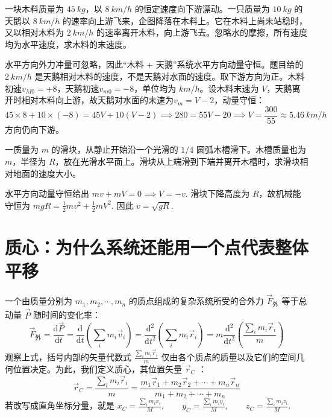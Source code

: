 \documentclass[lang=cn,11pt]{elegantbook}
\begin{document}
\begin{exercise}
一块木料质量为 \(\SI{45}{kg}\)，以 \(\SI{8}{km/h}\) 的恒定速度向下游漂动。一只质量为 \(\SI{10}{kg}\) 的天鹅以 \(\SI{8}{km/h}\) 的速率向上游飞来，企图降落在木料上。它在木料上尚未站稳时，又以相对木料为 \(\SI{2}{km/h}\) 的速率离开木料，向上游飞去。忽略水的摩擦，所有速度均为水平速度，求木料的末速度。
\end{exercise}
\begin{solution}
水平方向外力冲量可忽略，因此“木料 + 天鹅”系统水平方向动量守恒。题目给的 \(\SI{2}{km/h}\) 是天鹅相对木料的速度，不是天鹅对水面的速度。取下游方向为正。木料初速$v_{M0}=+8$，天鹅初速$v_{m0}=-8$，单位均为 \(\si{km/h}\)。设木料末速为 \(V\)，天鹅离开时相对木料向上游，故天鹅对水面的末速为$v_m=V-2$，动量守恒：\[45\times 8+10\times(-8)=45V+10(V-2)\implies 280=55V-20\implies V=\frac{300}{55}\approx \SI{5.46}{km/h}\]
方向仍向下游。
\end{solution}

\begin{exercise}
一质量为 \(m\) 的滑块，从静止开始沿一个光滑的 \(1/4\) 圆弧木槽滑下。木槽质量也为 \(m\)，半径为 \(R\)，放在光滑水平面上。滑块从上端滑到下端并离开木槽时，求滑块相对地面的速度大小。
\end{exercise}
\begin{solution}
水平方向动量守恒给出
 \(mv+mV=0\implies V=-v.\) 
滑块下降高度为 \(R\)，故机械能守恒为
 \(mgR=\frac12mv^2+\frac12mV^2.\) 
因此
 \(v=\sqrt{gR}.\) 
\end{solution}


\section{质心：为什么系统还能用一个点代表整体平移}

一个由质量分别为 $m_1, m_2, \cdots, m_n$ 的质点组成的复杂系统所受的合外力 $\vec{F}_{\text{外}}$ 等于总动量 $\vec{P}$ 随时间的变化率：
\[
\vec{F}_{\text{外}} = \frac{\mathrm{d}\vec{P}}{\mathrm{d}t} = \frac{\mathrm{d}}{\mathrm{d}t}\left(\sum_i m_i \vec{v}_i\right)= \frac{\mathrm{d}^2}{\mathrm{d}t^2}\left(\sum_i m_i \vec{r}_i\right)= m \frac{\mathrm{d}^2}{\mathrm{d}t^2}\left(\frac{\sum_i m_i \vec{r}_i}{m}\right)
\]
观察上式，括号内部的矢量代数式 $\frac{\sum_i m_i \vec{r}_i}{m}$ 仅由各个质点的质量以及它们的空间几何位置决定。为此，我们定义质心，其位置矢量 $\vec{r}_C$ ：
\[
\boxed{\vec{r}_C = \frac{\sum_i m_i \vec{r}_i}{m} = \frac{m_1\vec{r}_1 + m_2\vec{r}_2 + \cdots + m_n\vec{r}_n}{m_1 + m_2 + \cdots + m_n}}
\]
若改写成直角坐标分量，就是
 \(x_C=\frac{\sum_i m_i x_i}{M},\qquad y_C=\frac{\sum_i m_i y_i}{M},\qquad z_C=\frac{\sum_i m_i z_i}{M}.\) 
\end{document}
